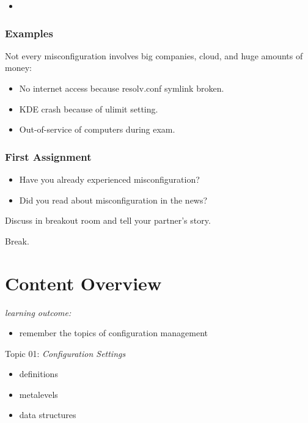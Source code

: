 {\begin{frame}
\begin{itemize}
		\item   \textcolor{white}{}
			\textcolor{white}{}
	\end{itemize}
\end{frame}
\begin{frame}
	\frametitle{Examples}
	Not every misconfiguration involves big companies, cloud, and huge amounts of money:
	\begin{itemize}
		\item No internet access because resolv.conf symlink broken.
		\item KDE crash because of ulimit setting.
		\item Out-of-service of computers during exam.
	\end{itemize}
\end{frame}
}
\begin{assignment}
	\frametitle{First Assignment}
	\begin{itemize}
		\item Have you already experienced misconfiguration?
		\item Did you read about misconfiguration in the news?
	\end{itemize}
	\begin{task}
	Discuss in breakout room and tell your partner's story.
	\end{task}
\end{assignment}

\begin{assignment}
	\begin{task}
	Break.
	\end{task}
\end{assignment}

\section{Content Overview}

\begin{frame}
	\textit{learning outcome:}
	\begin{itemize}
		\item remember the topics of configuration management
	\end{itemize}
\end{frame}


\begin{frame}
	Topic 01: \textit{Configuration Settings}
	\begin{itemize}
		\item definitions
		\item metalevels
		\item data structures
	\end{itemize}
\end{frame}

